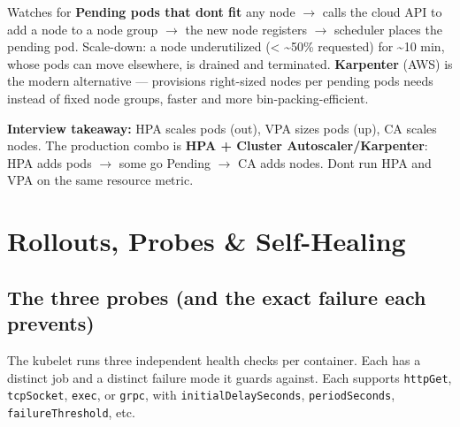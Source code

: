 \documentclass[11pt]{article}
\begin{document}
Watches for \textbf{Pending pods that don\textquotesingle t fit} any node \(\rightarrow\) calls the cloud API to add a node to a node group \(\rightarrow\) the new node registers \(\rightarrow\) scheduler places the pending pod. Scale-down: a node underutilized (\textless{} \textasciitilde50\% requested) for \textasciitilde10 min, whose pods can move elsewhere, is drained and terminated. \textbf{Karpenter} (AWS) is the modern alternative --- provisions right-sized nodes per pending pod\textquotesingle s needs instead of fixed node groups, faster and more bin-packing-efficient.

\textbf{Interview takeaway:} HPA scales pods (out), VPA sizes pods (up), CA scales nodes. The production combo is \textbf{HPA + Cluster Autoscaler/Karpenter}: HPA adds pods \(\rightarrow\) some go Pending \(\rightarrow\) CA adds nodes. Don\textquotesingle t run HPA and VPA on the same resource metric.

\section{Rollouts, Probes \& Self-Healing}\label{rollouts-probes--self-healing}

\subsection{The three probes (and the exact failure each prevents)}\label{the-three-probes-and-the-exact-failure-each-prevents}

The kubelet runs three independent health checks per container. Each has a distinct job and a distinct failure mode it guards against. Each supports \texttt{httpGet}, \texttt{tcpSocket}, \texttt{exec}, or \texttt{grpc}, with \texttt{initialDelaySeconds}, \texttt{periodSeconds}, \texttt{failureThreshold}, etc.
\end{document}
